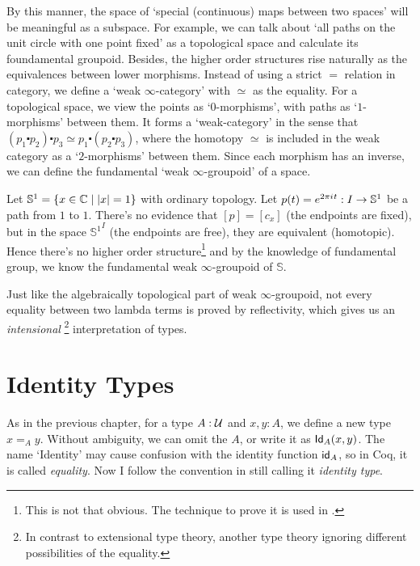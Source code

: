 By this manner, the space of `special (continuous) maps between two
spaces' will be meaningful as a subspace. For example, we can talk about
`all paths on the unit circle with one point fixed' as a topological space
and calculate its foundamental groupoid. Besides, the higher order structures
rise naturally as the equivalences between lower morphisms. Instead of
using a strict $=$ relation in category, we define a `weak $\infty$-category'
with $\simeq$ as the equality. For a topological space, we view the
points as `$0$-morphisms', with paths as `$1$-morphisms' between them. It
forms a `weak-category' in the sense that 
$(p_1\centerdot p_2)\centerdot p_3\simeq p_1\centerdot(p_2\centerdot p_3)$,
where the homotopy $\simeq$ is included in the weak category as a 
`$2$-morphisms' between them. Since each morphism has an inverse, we
can define the fundamental `weak $\infty$-groupoid' of a space. 

\newcommand{\sphere}{\mathbb{S}}
\begin{example}
    Let $\sphere^1=\{x\in\complex\mid |x| = 1\}$ with ordinary 
    topology. Let $p(t) = e^{2\pi\iu t}: I\to \sphere^1$ be a path from
    $1$ to $1$. There's no evidence that $[p]=[c_x]$ (the endpoints are 
    fixed), but in the space ${\sphere^1}^I$ (the endpoints are free), 
    they are equivalent (homotopic). Hence there's no higher order
    structure\footnote{This is not that obvious. The technique to prove
    it is used in \cite{homotopy-type-theory}.} 
    and by the knowledge of fundamental group, we know the fundamental
    weak $\infty$-groupoid of $\sphere$.
\end{example}

Just like the algebraically topological
part of weak $\infty$-groupoid, not every equality between two lambda
terms is proved by reflectivity, which gives us an {\it intensional}
\footnote{In contrast to extensional type theory, another type theory
ignoring different possibilities of the equality.} interpretation of types.

\section{Identity Types}

As in the previous chapter, for a type $A:\mathcal{U}$ and $x,y:A$,
we define a new type $x =_A y$. Without ambiguity, we can omit the $A$,
or write it as $\text{\sf Id}_A(x, y)$. The name `Identity' may cause confusion with
the identity function $\text{\sf id}_A$, so in Coq\cite{coq}, it is called {\it 
equality}. Now I follow the convention in \cite{homotopy-type-theory} still
calling it {\it identity type}.

